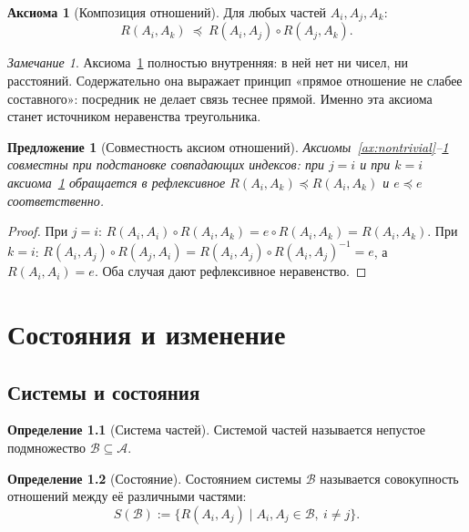 \documentclass[12pt,a4paper,oneside]{book}
\theoremstyle{definition}
\newtheorem{axiom}{Аксиома}[chapter]
\newtheorem{definition}{Определение}[chapter]
\theoremstyle{plain}
\newtheorem{proposition}{Предложение}[chapter]
\theoremstyle{remark}
\newtheorem{remark}{Замечание}[chapter]
\newcommand{\Parts}{\mathcal A}
\newcommand{\SubParts}{\mathcal B}
\newcommand{\Rel}{R}
\newcommand{\State}{S}
\newcommand{\comp}{\circ}
\newcommand{\Vord}{\preceq}
\newcommand{\ide}{e}
\begin{document}
\begin{axiom}[Композиция отношений]\label{ax:compose}
Для любых частей $A_i,A_j,A_k$:
\[
\Rel(A_i,A_k)\ \Vord\ \Rel(A_i,A_j)\comp\Rel(A_j,A_k).
\]
\end{axiom}

\begin{remark}
Аксиома~\ref{ax:compose} полностью внутренняя: в ней нет ни чисел, ни расстояний.
Содержательно она выражает принцип «прямое отношение не слабее составного»: посредник
не делает связь теснее прямой. Именно эта аксиома станет источником неравенства
треугольника.
\end{remark}

\begin{proposition}[Совместность аксиом отношений]
Аксиомы~\ref{ax:nontrivial}--\ref{ax:compose} совместны при подстановке совпадающих
индексов: при $j=i$ и при $k=i$ аксиома~\ref{ax:compose} обращается в рефлексивное
$\Rel(A_i,A_k)\Vord\Rel(A_i,A_k)$ и $\ide\Vord\ide$ соответственно.
\end{proposition}

\begin{proof}
При $j=i$: $\Rel(A_i,A_i)\comp\Rel(A_i,A_k)=\ide\comp\Rel(A_i,A_k)=\Rel(A_i,A_k)$.
При $k=i$: $\Rel(A_i,A_j)\comp\Rel(A_j,A_i)=\Rel(A_i,A_j)\comp\Rel(A_i,A_j)^{-1}=\ide$,
а $\Rel(A_i,A_i)=\ide$. Оба случая дают рефлексивное неравенство.
\end{proof}

\chapter{Состояния и изменение}

\section{Системы и состояния}

\begin{definition}[Система частей]
Системой частей называется непустое подмножество $\SubParts\subseteq\Parts$.
\end{definition}

\begin{definition}[Состояние]
Состоянием системы $\SubParts$ называется совокупность отношений между её различными
частями:
\[
\State(\SubParts):=\{\Rel(A_i,A_j)\mid A_i,A_j\in\SubParts,\ i\neq j\}.
\]
\end{definition}
\end{document}
